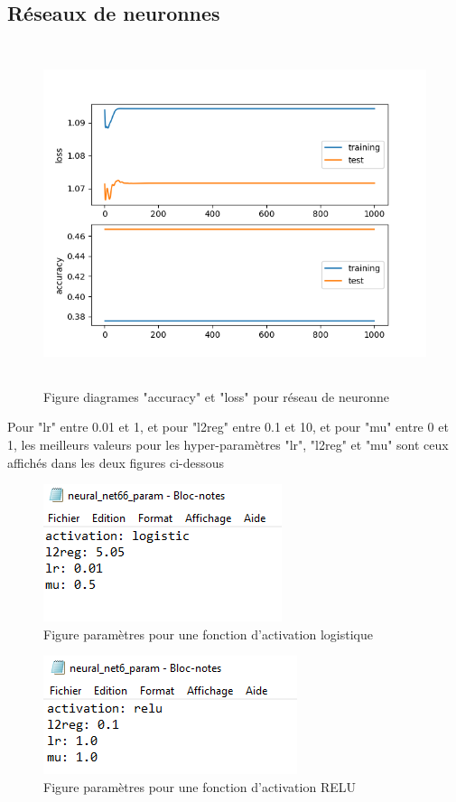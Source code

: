 \subsection{Réseaux de neuronnes}
\begin{figure}[H]
    \centering
    \includegraphics[width=17cm, height=10cm, keepaspectratio]{rn_plot.png}
    \caption{Figure diagrames "accuracy" et "loss" pour réseau de neuronne }
    \label{Figure diagrames "accuracy" et "loss" pour réseau de neuronne }
\end{figure}   
\par Pour "lr" entre 0.01 et 1, et pour "l2reg" entre 0.1 et 10, et pour "mu" entre 0 et 1, les meilleurs valeurs pour les hyper-paramètres "lr", "l2reg" et "mu" sont ceux affichés dans les deux figures ci-dessous
\begin{figure}[H]
    \centering
    \includegraphics{rn_param_logistic.PNG}
    \caption{Figure paramètres pour une fonction d'activation logistique}
    \label{paramètres pour une fonction d'activation logistique }
\end{figure}
\begin{figure}[H]
    \centering
    \includegraphics{rm_param_relu.PNG}
    \caption{Figure paramètres pour une fonction d'activation RELU}
    \label{paramètres pour une fonction d'activation RELU }
\end{figure}
